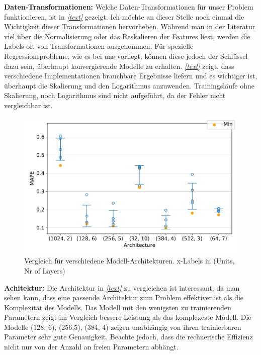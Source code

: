\textbf{Daten-Transformationen:}
Welche Daten-Transformationen für unser Problem funktionieren, ist in \textit{\autoref{text}} gezeigt. Ich möchte an dieser Stelle noch einmal die Wichtigkeit dieser Transformationen hervorheben. Während man in der Literatur viel über die Normalisierung oder das Reskalieren der Features liest, werden die Labels oft von Transformationen ausgenommen. Für spezielle Regressionsprobleme, wie es bei uns vorliegt, können diese jedoch der Schlüssel dazu sein, überhaupt konvergierende Modelle zu erhalten. \textit{\autoref{text}} zeigt, dass verschiedene Implementationen brauchbare Ergebnisse liefern und es wichtiger ist, überhaupt die Skalierung und den Logarithmus anzuwenden. Trainingsläufe ohne Skalierung, noch Logarithmus sind nicht aufgeführt, da der Fehler nicht vergleichbar ist. \\
\begin{figure}[bt]
	\centering
	\includegraphics[width=13cm]{graphics/33}
	\caption{Vergleich für verschiedene Modell-Architekturen.
		x-Labels in (Units, Nr of Layers)}
\end{figure}

\textbf{Achitektur:} %
Die Architektur in \textit{\autoref{text}} zu vergleichen ist interessant, da man sehen kann, dass eine passende Architektur zum Problem effektiver ist als die Komplexität des Modells. Das Modell mit den wenigsten zu trainierenden Parametern zeigt im Vergleich bessere Leistung als das komplexeste Modell. Die Modelle (128, 6), (256,5), (384, 4) zeigen unabhängig von ihren trainierbaren Parameter sehr gute Genauigkeit. Beachte jedoch, dass die rechnerische Effizienz nicht nur von der Anzahl an freien Parametern abhängt. 

